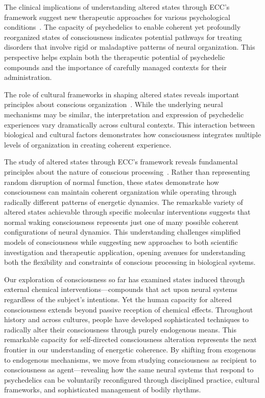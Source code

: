 The clinical implications of understanding altered states through ECC's framework suggest new therapeutic approaches for various psychological conditions~\cite{hunt2024electromagnetic}. The capacity of psychedelics to enable coherent yet profoundly reorganized states of consciousness indicates potential pathways for treating disorders that involve rigid or maladaptive patterns of neural organization. This perspective helps explain both the therapeutic potential of psychedelic compounds and the importance of carefully managed contexts for their administration.

The role of cultural frameworks in shaping altered states reveals important principles about conscious organization~\cite{butlin2023consciousnessartificialintelligenceinsights}. While the underlying neural mechanisms may be similar, the interpretation and expression of psychedelic experiences vary dramatically across cultural contexts. This interaction between biological and cultural factors demonstrates how consciousness integrates multiple levels of organization in creating coherent experience.

The study of altered states through ECC's framework reveals fundamental principles about the nature of conscious processing~\cite{pinotsis2023cytoelectric, zheng2025unbearable}. Rather than representing random disruption of normal function, these states demonstrate how consciousness can maintain coherent organization while operating through radically different patterns of energetic dynamics. The remarkable variety of altered states achievable through specific molecular interventions suggests that normal waking consciousness represents just one of many possible coherent configurations of neural dynamics. This understanding challenges simplified models of consciousness while suggesting new approaches to both scientific investigation and therapeutic application, opening avenues for understanding both the flexibility and constraints of conscious processing in biological systems.

Our exploration of consciousness so far has examined states induced through external chemical interventions—compounds that act upon neural systems regardless of the subject's intentions. Yet the human capacity for altered consciousness extends beyond passive reception of chemical effects. Throughout history and across cultures, people have developed sophisticated techniques to radically alter their consciousness through purely endogenous means. This remarkable capacity for self-directed consciousness alteration represents the next frontier in our understanding of energetic coherence. By shifting from exogenous to endogenous mechanisms, we move from studying consciousness as recipient to consciousness as agent—revealing how the same neural systems that respond to psychedelics can be voluntarily reconfigured through disciplined practice, cultural frameworks, and sophisticated management of bodily rhythms.
